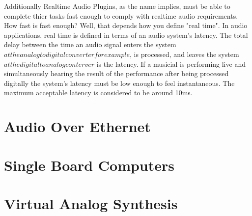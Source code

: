  Additionally Realtime Audio Plugins, as the name implies, must be able to complete thier tasks fast enough to comply with realtime audio requirements. How fast is fast enough? Well, that depends how you define "real time". In audio applications, real time is defined in terms of an audio system's latency. The total delay between the time an audio signal enters the system \(at the analog to digital converter for example\), is processed, and leaves the system \(at the digital to analog conterver\) is the latency. If a musicial is performing live and simultaneously hearing the result of the performance after being processed digitally the system's latency must be low enough to feel instantaneous. The maximum acceptable latency is considered to be around 10ms\cite{AES67-2013}.

\section{Audio Over Ethernet}

\section{Single Board Computers}

\section{Virtual Analog Synthesis}